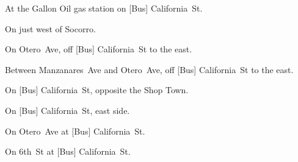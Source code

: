 
\begin{LocationList}

At the Gallon Oil gas station on [Bus]  California~St.

On  just west of Socorro.

On Otero~Ave, off [Bus]  California~St to the east.

Between Manzanares~Ave and Otero~Ave, off [Bus]  California~St to the east.

\Location{\RestArea \Rest}
On [Bus]  California~St, opposite the Shop Town.

On [Bus]  California~St, east side.

On Otero~Ave at [Bus]  California~St.

\Location{\TruckService \Service}
On 6th~St at [Bus] California~St.

\end{LocationList}

